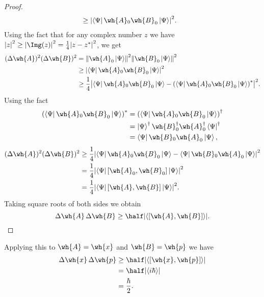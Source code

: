 \documentclass[12pt, a4paper]{article}
\begin{document}
\begin{proof}
\[\begin{aligned}
        &\geq \abs{\bra{\Psi} \wh{A}_0\wh{B}_0 \ket{\Psi}}^2.
    \end{aligned}\]
    Using the fact that for any complex number \(z\) we have \(\abs{z}^2 \geq \abs{\Img(z)}^2 = \frac{1}{4}\abs{z-z^*}^2\), we get
    \[\begin{aligned}
        (\Delta \wh{A})^2 (\Delta \wh{B})^2 &=\norm{\wh{A}_0 \ket{\Psi}}^2 \norm{\wh{B}_0 \ket{\Psi}}^2 \\
        &\geq \abs{\bra{\Psi} \wh{A}_0\wh{B}_0 \ket{\Psi}}^2 \\
        &\geq \frac{1}{4} \abs{\bra{\Psi} \wh{A}_0\wh{B}_0 \ket{\Psi} - \left( \bra{\Psi} \wh{A}_0\wh{B}_0 \ket{\Psi} \right)^*}^2.
    \end{aligned}\]
    Using the fact 
    \[\begin{aligned}
        \left( \bra{\Psi} \wh{A}_0\wh{B}_0 \ket{\Psi} \right)^* &= \left( \bra{\Psi} \wh{A}_0\wh{B}_0 \ket{\Psi} \right)^{\dagger} \\
        &= \ket{\Psi}^{\dagger} \wh{B}_0^{\dagger} \wh{A}_0^{\dagger} \bra{\Psi}^{\dagger} \\
        &= \bra{\Psi} \wh{B}_0 \wh{A}_0 \ket{\Psi},
    \end{aligned}\]
    \[\begin{aligned}
        (\Delta \wh{A})^2 (\Delta \wh{B})^2 &\geq \frac{1}{4} \abs{\bra{\Psi} \wh{A}_0\wh{B}_0 \ket{\Psi}-\bra{\Psi} \wh{B}_0 \wh{A}_0 \ket{\Psi}}^2 \\
        &= \frac{1}{4} \abs{\bra{\Psi} \left[ \wh{A}_0,\wh{B}_0 \right] \ket{\Psi}}^2 \\
        &= \frac{1}{4}  \abs{\bra{\Psi} \left[ \wh{A},\wh{B} \right] \ket{\Psi}}^2.
    \end{aligned}\]
    Taking square roots of both sides we obtain 
    \[\Delta \wh{A} \, \Delta \wh{B} \geq \half \abs{ \left\langle \left[\wh{A},\wh{B}\right] \right\rangle }.\]
\end{proof}

\begin{mdexample}
    Applying this to \(\wh{A}=\wh{x}\) and \(\wh{B}=\wh{p}\) we have 
    \[\begin{aligned}
        \Delta\wh{x} \, \Delta\wh{p} &\geq \half \abs{ \left\langle \left[\wh{x},\wh{p}\right] \right\rangle } \\
        &= \half \abs{\langle i\hbar \rangle} \\
        &= \frac{\hbar}{2}.
    \end{aligned}\] 
\end{mdexample}
\end{document}
